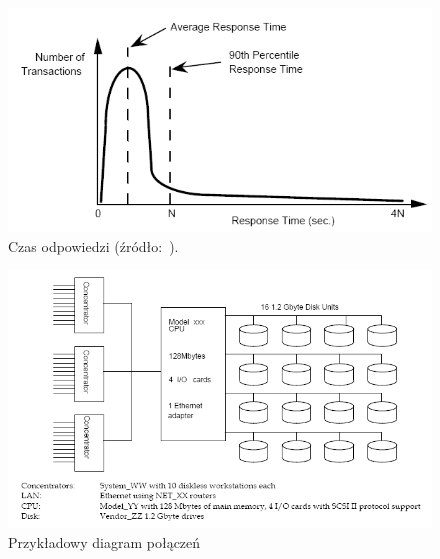 \begin{figure}[p]
\begin{center}
\includegraphics[width=\linewidth]{figures/tpc/tpc_required_reporting1.png}
\end{center}
\caption{Czas odpowiedzi (źródło:~\cite{TPC2}).}\label{rys:tpc_required_reporting1}
\end{figure}

\begin{figure}[p]
\begin{center}
\includegraphics[width=\linewidth]{figures/tpc/tpc_full_disclosure1.png}
\end{center}
\caption{Przykładowy diagram połączeń\cite{TPC2}}\label{rys:tpc_full_disclosure1}
\end{figure}

